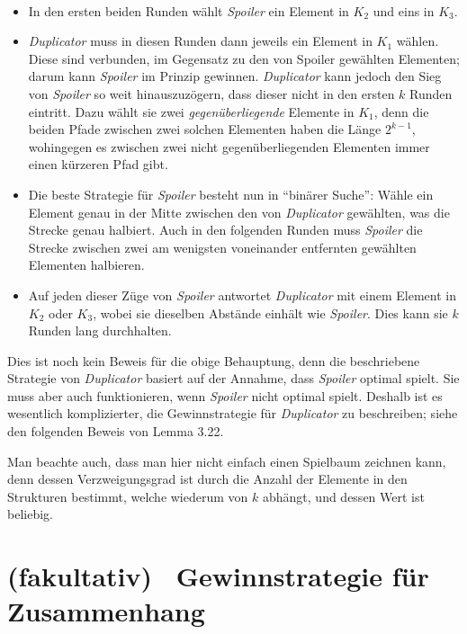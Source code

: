 \documentclass[fontsize=11pt, twoside=false, numbers=autoenddot]{scrbook}
\begin{document}
~
%
\begin{itemize}
  \item
    In den ersten beiden Runden wählt \emph{Spoiler}
    ein Element in $K_2$ und eins in $K_3$.
  \item
    \emph{Duplicator} muss in diesen Runden dann jeweils ein Element in $K_1$ wählen.
    Diese sind verbunden, im Gegensatz zu den von Spoiler gewählten Elementen;
    darum kann \emph{Spoiler} im Prinzip gewinnen.
    \emph{Duplicator} kann jedoch den Sieg von \emph{Spoiler} so weit hinauszuzögern,
    dass dieser nicht in den ersten $k$ Runden eintritt.
    Dazu wählt sie zwei \emph{gegenüberliegende} Elemente in $K_1$,
    denn die beiden Pfade zwischen zwei solchen Elementen haben die Länge $2^{k-1}$,
    wohingegen es zwischen zwei nicht gegenüberliegenden Elementen immer einen kürzeren Pfad gibt.
  \item
    Die beste Strategie für \emph{Spoiler} besteht nun in "`binärer Suche"':
    Wähle ein Element genau in der Mitte zwischen den von \emph{Duplicator} gewählten,
    was die Strecke genau halbiert.
    Auch in den folgenden Runden muss \emph{Spoiler} die Strecke zwischen zwei
    am wenigsten voneinander entfernten gewählten Elementen halbieren.
  \item
    Auf jeden dieser Züge von \emph{Spoiler} antwortet \emph{Duplicator}
    mit einem Element in $K_2$ oder $K_3$,
    wobei sie dieselben Abstände einhält wie \emph{Spoiler}.
    Dies kann sie $k$ Runden lang durchhalten.
\end{itemize}
%
Dies ist noch kein Beweis für die obige Behauptung,
denn die beschriebene Strategie von \emph{Duplicator}
basiert auf der Annahme, dass \emph{Spoiler} optimal spielt.
Sie muss aber auch funktionieren, wenn 
\emph{Spoiler} nicht optimal spielt.
Deshalb ist es wesentlich komplizierter, die Gewinnstrategie für \emph{Duplicator} zu beschreiben;
siehe den folgenden Beweis von Lemma 3.22.

Man beachte auch, dass man hier nicht einfach einen Spielbaum zeichnen kann,
denn dessen Verzweigungsgrad ist durch die Anzahl der Elemente in den Strukturen bestimmt,
welche wiederum von $k$ abhängt, und dessen Wert ist beliebig.

\section*{(fakultativ)~ Gewinnstrategie für Zusammenhang}
\end{document}

